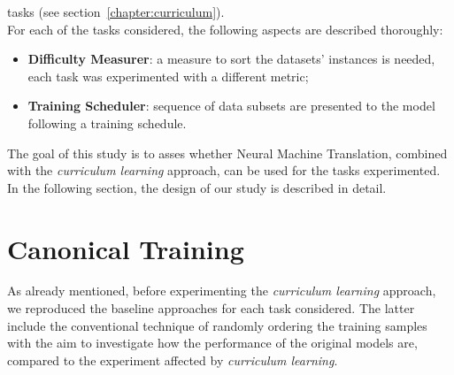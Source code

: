 tasks (see section~\ref{chapter:curriculum}).\\
For each of the tasks considered, the following aspects are described thoroughly:
\begin{itemize}
    \item \textbf{Difficulty Measurer}: a measure to sort the datasets' instances is needed, each task was experimented with a different metric; 
    \item \textbf{Training Scheduler}: sequence of data subsets are presented to the model following a training schedule.
\end{itemize}
The goal of this study is to asses whether Neural Machine Translation, combined with the \textit{curriculum learning} approach, 
can be used for the tasks experimented. In the following section, the design of our study is described in detail.


\section{Canonical Training}\label{chapter:canonical}
As already mentioned, before experimenting the \textit{curriculum learning} approach, we reproduced the baseline approaches for each task considered.
The latter include the conventional technique of randomly ordering the training samples with the aim to investigate how the performance 
of the original models are, compared to the experiment affected by \textit{curriculum learning}.
